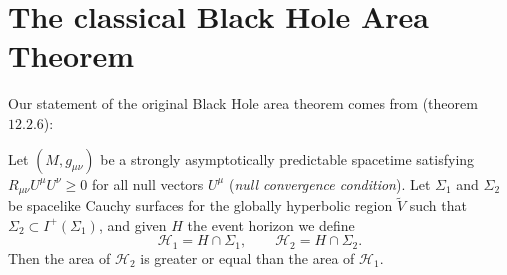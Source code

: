 \section{The classical Black Hole Area Theorem}
\label{sec:classical-bh-area}

Our statement of the original Black Hole area theorem comes from \cite{wald2010general} (theorem \(12.2.6\)):
\begin{theorem}
	\label{th:classical-bh-area}
	Let \((M, g_{\mu\nu})\) be a strongly asymptotically predictable spacetime satisfying \(R_{\mu\nu}U^{\mu}U^{\nu} \ge 0\) for all null vectors \(U^{\mu}\) (\emph{null convergence condition}). Let \(\Sigma_1\) and \(\Sigma_2\) be spacelike Cauchy surfaces for the globally hyperbolic region \(\tilde{V}\) such that \(\Sigma_2 \subset I^+(\Sigma_1)\), and given \(H\) the event horizon we define
	\[
	\mathscr{H}_1 = H \cap \Sigma_1, \quad \quad \mathscr{H}_2 = H \cap \Sigma_2.
	\]
	Then the area of \(\mathscr{H}_2\) is greater or equal than the area of \(\mathscr{H}_1\).
\end{theorem}

